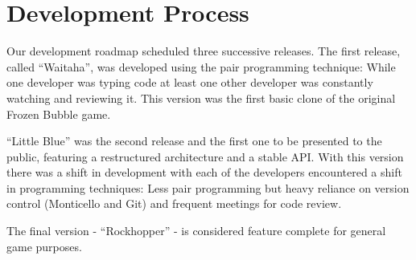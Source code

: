 \section{Development Process}
Our development roadmap scheduled three successive releases. 
The first release, called ``Waitaha'', was developed using 
the pair programming technique: While one developer was 
typing code at least one other developer was constantly 
watching and reviewing it. This version was the first 
basic clone of the original Frozen Bubble game.

``Little Blue'' was the second release and the first one 
to be presented to the public, featuring a restructured 
architecture and a stable API. With this version there was 
a shift in development with each of the developers encountered 
a shift in programming techniques: Less pair programming but heavy 
reliance on version control (Monticello and Git) and frequent 
meetings for code review.

The final version - ``Rockhopper'' - is considered feature complete 
for general game purposes.
